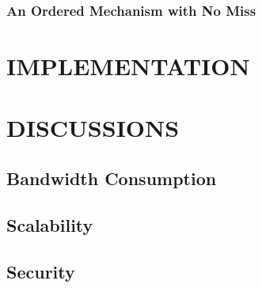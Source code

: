 \documentclass{sigchi}
\begin{document}
\subsubsection{An Ordered Mechanism with No Miss}









\section{IMPLEMENTATION}
\label{implementation}



\section{DISCUSSIONS}
\label{discussions}

\subsection{Bandwidth Consumption}

\subsection{Scalability}

\subsection{Security}
\end{document}
